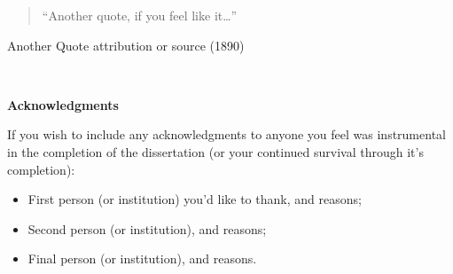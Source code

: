 \begin{quotation}
``Another quote, if you feel like it\ldots''
\end{quotation}
\begin{flushright}
Another Quote attribution or source (1890)
\end{flushright}

\ 


\newpage

\begin{center}{\Large\bf Acknowledgments}\end{center}

\vspace{0.3cm}

\noindent If you wish to include any acknowledgments to anyone you feel was instrumental in the completion of the dissertation (or your continued survival through it's completion):
\begin{itemize}
	\item First person (or institution) you'd like to thank, and reasons;

	\item Second person (or institution), and reasons;

	\item Final person (or institution), and reasons.
\end{itemize}


\cleardoublepage
\pagestyle{plain}
\setcounter{page}{1}
\ifpdf
{}
\fi
\tableofcontents


\cleardoublepage
\ifpdf
{}
\fi
{}
\listoffigures


\cleardoublepage
\ifpdf
{}
\fi
{}


\cleardoublepage
\ifpdf
{}
\fi
{}


\cleardoublepage
\ifpdf
{}
\fi
{}
\listoftables

